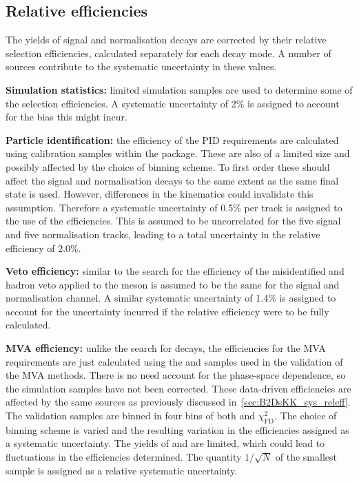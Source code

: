 \subsection{Relative efficiencies}
The yields of signal and normalisation decays are corrected by their relative selection efficiencies, calculated separately for each \Dsp decay mode. A number of sources contribute to the systematic uncertainty in these values.

\begin{description}
\item \textbf{Simulation statistics:} limited simulation samples are used to determine some of the selection efficiencies. A systematic uncertainty of 2\% is assigned to account for the bias this might incur. 

\item \textbf{Particle identification:} the efficiency of the PID requirements are calculated using calibration samples within the \pidcalib package. These are also of a limited size and possibly affected by the choice of binning scheme. To first order these should affect the signal and normalisation decays to the same extent as the same final state is used. However, differences in the kinematics could invalidate this assumption. Therefore a systematic uncertainty of 0.5\% per track is assigned to the use of the \pidcalib efficiencies. This is assumed to be uncorrelated for the five signal and five normalisation tracks, leading to a total uncertainty in the relative efficiency of 2.0\%. 

\item \textbf{Veto efficiency:} similar to the search for \decay{\Bp}{\Dsp\Kp\Km} the efficiency of the misidentified \D and \Lc hadron veto applied to the \Dsp meson is assumed to be the same for the signal and normalisation channel. A similar systematic uncertainty of 1.4\% is assigned to account for the uncertainty incurred if the relative efficiency were to be fully calculated. 

\item \textbf{MVA efficiency:} unlike the search for \decay{\Bp}{\Dsp\Kp\Km} decays, the efficiencies for the MVA requirements are just calculated using the \decay{\Bs}{\jpsi\phiz} and \decay{\Bsb}{\Dsp\pim} samples used in the validation of the MVA methods. There is no need account for the phase-space dependence, so the simulation samples have not been corrected. 
These data-driven efficiencies are affected by the same sources as previously discussed in~\ref{sec:B2DsKK_sys_releff}.
The validation samples are binned in four bins of both \pt and $\chi^{2}_{\text{FD}}$. The choice of binning scheme is varied and the resulting variation in the efficiencies assigned as a systematic uncertainty. The yields of \decay{\Bs}{\jpsi\phiz} and \decay{\Bsb}{\Dsp\pim} are limited, which could lead to fluctuations in the efficiencies determined. The quantity $1/\sqrt{N}$ of the smallest sample is assigned as a relative systematic uncertainty. 


\end{description}
